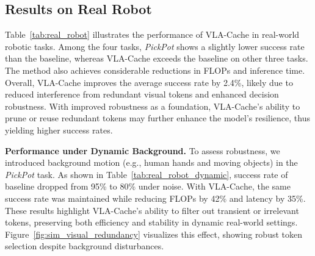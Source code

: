 

\subsection{Results on Real Robot}
Table~\ref{tab:real_robot} illustrates the performance of VLA-Cache in real-world robotic tasks. Among the four tasks, \emph{PickPot} shows a slightly lower success rate than the baseline, whereas VLA-Cache exceeds the baseline on other three tasks. The method also achieves considerable reductions in FLOPs and inference time. Overall, VLA-Cache improves the average success rate by 2.4\%, likely due to reduced interference from redundant visual tokens and enhanced decision robustness. With improved robustness as a foundation, VLA-Cache’s ability to prune or reuse redundant tokens may further enhance the model’s resilience, thus yielding higher success rates.

\textbf{Performance under Dynamic Background.}
To assess robustness, we introduced background motion (e.g., human hands and moving objects) in the \emph{PickPot} task. As shown in Table~\ref{tab:real_robot_dynamic}, success rate of baseline dropped from 95\% to 80\% under noise. With VLA-Cache, the same success rate was maintained while reducing FLOPs by 42\% and latency by 35\%. These results highlight VLA-Cache's ability to filter out transient or irrelevant tokens, preserving both efficiency and stability in dynamic real-world settings. Figure~\ref{fig:sim_visual_redundancy} visualizes this effect, showing robust token selection despite background disturbances.
